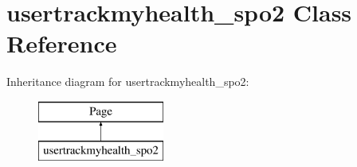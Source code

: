 \hypertarget{classusertrackmyhealth__spo2}{\section{usertrackmyhealth\-\_\-spo2 Class Reference}
\label{classusertrackmyhealth__spo2}
}
Inheritance diagram for usertrackmyhealth\-\_\-spo2\-:\begin{figure}[H]
\begin{center}
\leavevmode
\includegraphics[height=2.000000cm]{classusertrackmyhealth__spo2}
\end{center}
\end{figure}
